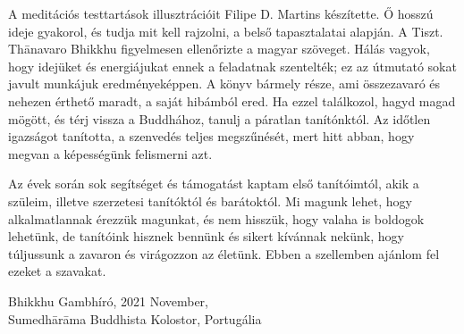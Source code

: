 A meditációs testtartások illusztrációit Filipe D. Martins készítette. Ő
hosszú ideje gyakorol, és tudja mit kell rajzolni, a belső tapasztalatai
alapján. A Tiszt. Thānavaro Bhikkhu figyelmesen ellenőrizte a magyar
szöveget. Hálás vagyok, hogy idejüket és energiájukat ennek a feladatnak
szentelték; ez az útmutató sokat javult munkájuk eredményeképpen. A
könyv bármely része, ami összezavaró és nehezen érthető maradt, a saját
hibámból ered. Ha ezzel találkozol, hagyd magad mögött, és térj vissza a
Buddhához, tanulj a páratlan tanítónktól. Az időtlen igazságot
tanította, a szenvedés teljes megszűnését, mert hitt abban, hogy megvan
a képességünk felismerni azt.

Az évek során sok segítséget és támogatást kaptam első tanítóimtól, akik
a szüleim, illetve szerzetesi tanítóktól és barátoktól. Mi magunk lehet,
hogy alkalmatlannak érezzük magunkat, és nem hisszük, hogy valaha is
boldogok lehetünk, de tanítóink hisznek bennünk és sikert kívánnak
nekünk, hogy túljussunk a zavaron és virágozzon az életünk. Ebben a
szellemben ajánlom fel ezeket a szavakat.

\bigskip

\enlargethispage*{2\baselineskip}

{\raggedleft
Bhikkhu Gambhíró,
2021 November,\\
Sumedhārāma Buddhista Kolostor, Portugália
\par}
